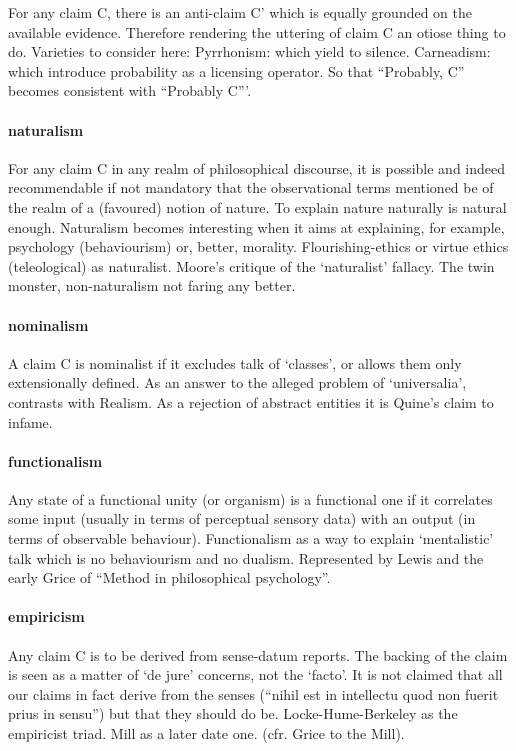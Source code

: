 \documentclass[10pt,titlepage]{book}
\begin{document}
For any claim C, there is an anti-claim C' which is equally grounded on the available evidence.
Therefore rendering the uttering of claim C an otiose thing to do.
Varieties to consider here: Pyrrhonism: which yield to silence.
Carneadism: which introduce probability as a licensing operator.
So that ``Probably, C'' becomes consistent with ``Probably C'''. 

\paragraph{naturalism}

For any claim C in any realm of philosophical discourse,
it is possible and indeed recommendable if not mandatory that the observational 
terms mentioned be of the realm of a (favoured) notion of nature.
To explain nature naturally is natural enough.
Naturalism becomes interesting when it aims at explaining, for example, psychology
(behaviourism) or, better, morality.
Flourishing-ethics or virtue ethics (teleological) as naturalist. 
Moore's critique of the `naturalist' fallacy.
The twin monster, non-naturalism not faring any better.
 
\paragraph{nominalism} A claim C is nominalist if it excludes talk of `classes', or  
allows them only extensionally defined.
As an answer to the alleged problem of `universalia', contrasts with Realism.
As a rejection of abstract entities it is Quine's claim to infame.
 
\paragraph{functionalism} Any state of a functional unity (or organism) is a  
functional one if it correlates some input (usually in terms of perceptual  sensory 
data) with an output (in terms of observable behaviour). Functionalism  as a 
way to explain `mentalistic' talk which is no behaviourism and no dualism.  
Represented by Lewis and the early Grice of ``Method in philosophical  
psychology''. 
 
\paragraph{empiricism} Any claim C is to be derived from sense-datum reports. The  
backing of the claim is seen as a matter of `de jure' concerns, not the 
`facto'.  It is not claimed that all our claims in fact derive from the senses 
(``nihil est in intellectu quod non fuerit prius in sensu'') but that they 
should do be. Locke-Hume-Berkeley as the empiricist triad. Mill as a later date 
one. (cfr.  Grice to the Mill).
 
\end{document}
